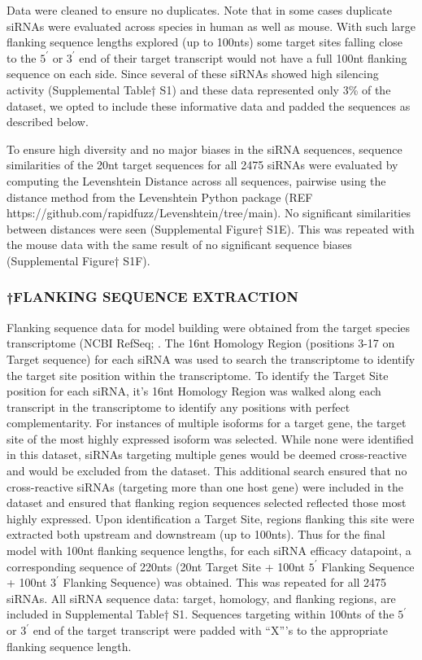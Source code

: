 \documentclass{report}
\begin{document}
Data were cleaned to ensure no duplicates. Note that in some cases duplicate siRNAs were evaluated across species in human as well as mouse. With such large flanking sequence lengths explored (up to 100nts) some target sites falling close to the $5^\prime$ or $3^\prime$ end of their target transcript would not have a full 100nt flanking sequence on each side. Since several of these siRNAs showed high silencing activity (Supplemental Table† S1) and these data represented only 3\% of the dataset, we opted to include these informative data and padded the sequences as described below.

To ensure high diversity and no major biases in the siRNA sequences, sequence similarities of the 20nt target sequences for all 2475 siRNAs were evaluated by computing the Levenshtein Distance \cite{levenshtein_binary_1966} across all sequences, pairwise using the distance method from the Levenshtein Python package (REF https://github.com/rapidfuzz/Levenshtein/tree/main). No significant similarities between distances were seen (Supplemental Figure† S1E). This was repeated with the mouse data with the same result of no significant sequence biases (Supplemental Figure† S1F). 

\subsubsection{†FLANKING SEQUENCE EXTRACTION}
Flanking sequence data for model building were obtained from the target species transcriptome (NCBI RefSeq; \cite{oleary_reference_2016}. The 16nt Homology Region (positions 3-17 on Target sequence) for each siRNA was used to search the transcriptome to identify the target site position within the transcriptome. To identify the Target Site position for each siRNA, it’s 16nt Homology Region was walked along each transcript in the transcriptome to identify any positions with perfect complementarity. For instances of multiple isoforms for a target gene, the target site of the most highly expressed isoform was selected. While none were identified in this dataset, siRNAs targeting multiple genes would be deemed cross-reactive and would be excluded from the dataset. This additional search ensured that no cross-reactive siRNAs (targeting more than one host gene) were included in the dataset and ensured that flanking region sequences selected reflected those most highly expressed. Upon identification a Target Site, regions flanking this site were extracted both upstream and downstream (up to 100nts). Thus for the final model with 100nt flanking sequence lengths, for each siRNA efficacy datapoint, a corresponding sequence of 220nts (20nt Target Site + 100nt $5^\prime$ Flanking Sequence + 100nt $3^\prime$ Flanking Sequence) was obtained. This was repeated for all 2475 siRNAs. All siRNA sequence data: target, homology, and flanking regions, are included in Supplemental Table† S1. 
Sequences targeting within 100nts of the $5^\prime$ or $3^\prime$ end of the target transcript were padded with “X”’s to the appropriate flanking sequence length.
\end{document}
